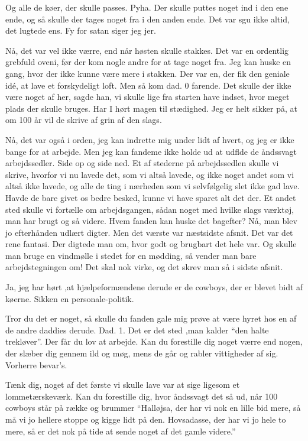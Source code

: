 \documentclass[a4paper,11pt]{article}
\begin{document}
\begin{sketch}
Og alle de køer, der skulle passes.  Pyha.  Der skulle puttes noget
ind i den ene ende, og så skulle der tages noget fra i den anden ende.
Det var sgu ikke altid, det lugtede ens.  Fy for satan siger jeg jer.

Nå, det var vel ikke værre, end når høsten skulle stakkes.  Det var en
ordentlig grebfuld oveni, før der kom nogle andre for at tage noget
fra.  Jeg kan huske en gang, hvor der ikke kunne være mere i stakken.
Der var en, der fik den geniale idé, at lave et forskydeligt loft.
Men så kom dad. 0 farende.  Det skulle der ikke være noget af her,
sagde han, vi skulle lige fra starten have indset, hvor meget plads
der skulle bruges.  Har I hørt magen til stædighed.  Jeg er helt
sikker på, at om 100 år vil de skrive af grin af den slags.

Nå, det var også i orden, jeg kan indrette mig under lidt af hvert, og
jeg er ikke bange for at arbejde.  Men jeg kan fandeme ikke holde ud
at udflde de åndssvagt arbejdssedler.  Side op og side ned.  Et af
stederne på arbejdssedlen skulle vi skrive, hvorfor vi nu lavede det,
som vi altså lavede, og ikke noget andet som vi altså ikke lavede, og
alle de ting i nærheden som vi selvfølgelig slet ikke gad lave.  Havde
de bare givet os bedre besked, kunne vi have sparet alt det der.  Et
andet sted skulle vi fortælle om arbejdsgangen, sådan noget med hvilke
slags værktøj, man har brugt og så videre.  Hvem fanden kan huske det
bagefter?  Nå, man blev jo efterhånden udlært digter.  Men det værste
var næstsidste afsnit.  Det var det rene fantasi.  Der digtede man om,
hvor godt og brugbart det hele var.  Og skulle man bruge en vindmølle
i stedet for en mødding, så vender man bare arbejdstegningen om!  Det
skal nok virke, og det skrev man så i sidste afsnit.


 Ja, jeg har hørt ,at hjælpeformændene derude er de cowboys,
der er blevet bidt af køerne.  Sikken en personale-politik.

 Tror du det er noget, så skulle du fanden gale mig prøve at
være hyret hos en af de andre daddies derude.  Dad. 1.  Det er det
sted ,man kalder "`den halte trekløver"'.  Der får du lov at arbejde.
Kan du forestille dig noget værre end nogen, der slæber dig gennem ild
og møg, mens de går og rabler vittigheder af sig.  Vorherre bevar's.

Tænk dig, noget af det første vi skulle lave var at sige ligesom et
lommetærskeværk.  Kan du forestille dig, hvor åndssvagt det så ud, når
100 cowboys står på række og brummer "`Halløjsa, der har vi nok en
lille bid mere, så må vi jo hellere stoppe og kigge lidt på den.
Hovsadasse, der har vi jo hele to mere, så er det nok på tide at sende
noget af det gamle videre."'


\end{sketch}
\end{document}
